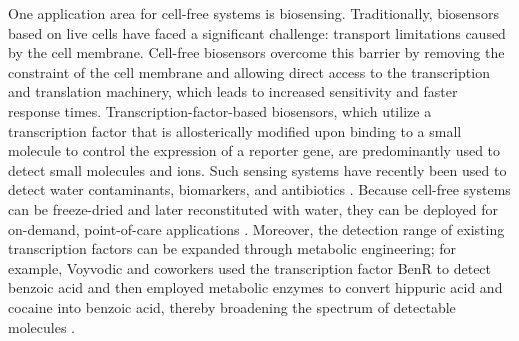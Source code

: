 \documentclass[12pt]{article}
\begin{document}
One application area for cell-free systems is biosensing. Traditionally, biosensors based on live cells have faced a significant challenge: transport limitations caused by the cell membrane. Cell-free biosensors overcome this barrier by removing the constraint of the cell membrane and allowing direct access to the transcription and translation machinery, which leads to increased sensitivity and faster response times. Transcription-factor-based biosensors, which utilize a transcription factor that is allosterically modified upon binding to a small molecule to control the expression of a reporter gene, are predominantly used to detect small molecules and ions. Such sensing systems have recently been used to detect water contaminants, biomarkers, and antibiotics \cite{soltani2018reengineering,grawe2019paper,voyvodic2020cell,jung2020cell,pardee2014based,wen2017cell,li2025cellfree,mcsweeney2025modular}. Because cell-free systems can be freeze-dried and later reconstituted with water, they can be deployed for on-demand, point-of-care applications \cite{jung2020cell}. Moreover, the detection range of existing transcription factors can be expanded through metabolic engineering; for example, Voyvodic and coworkers used the transcription factor BenR to detect benzoic acid and then employed metabolic enzymes to convert hippuric acid and cocaine into benzoic acid, thereby broadening the spectrum of detectable molecules \cite{voyvodic2019plug}.
\end{document}
